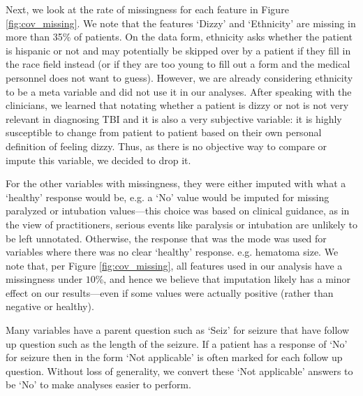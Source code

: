 \documentclass[11pt, letterpaper]{amsart}
\begin{document}
Next, we look at the rate of missingness for each feature in Figure \ref{fig:cov_missing}. We note that the features `Dizzy' and `Ethnicity' are missing in more than 35\% of patients. On the data form, ethnicity asks whether the patient is hispanic or not and may potentially be skipped over by a patient if they fill in the race field instead (or if they are too young to fill out a form and the medical personnel does not want to guess). However, we are already considering ethnicity to be a meta variable and did not use it in our analyses. After speaking with the clinicians, we learned that notating whether a patient is dizzy or not is not very relevant in diagnosing TBI and it is also a very subjective variable: it is highly susceptible to change from patient to patient based on their own personal definition of feeling dizzy. Thus, as there is no objective way to compare or impute this variable, we decided to drop it.

For the other variables with missingness, they were either imputed with what a `healthy' response would be, e.g. a `No' value would be imputed for missing paralyzed or intubation values---this choice was based on clinical guidance, as in the view of practitioners, serious events like paralysis or intubation are unlikely to be left unnotated. Otherwise, the response that was the mode was used for variables where there was no clear `healthy' response. e.g. hematoma size. We note that, per Figure \ref{fig:cov_missing}, all features used in our analysis have a missingness under $10$\%, and hence we believe that imputation likely has a minor effect on our results---even if some values were actually positive (rather than negative or healthy). 

Many variables have a parent question such as `Seiz' for seizure that have follow up question such as the length of the seizure. If a patient has a response of `No' for seizure then in the form `Not applicable' is often marked for each follow up question. Without loss of generality, we convert these `Not applicable' answers to be `No' to make analyses easier to perform.
\end{document}
